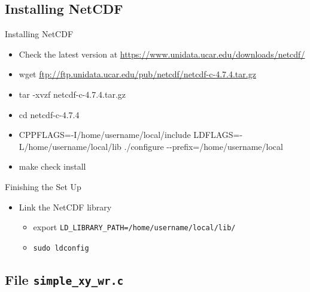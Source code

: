 \documentclass[compress,11pt,xcolor=svgnames,aspectratio=169]{beamer}
\begin{document}
\subsection{Installing NetCDF}

\begin{frame}[fragile]{Installing NetCDF}

\begin{itemize}
\setlength\itemsep{0.3cm}

  \item Check the latest version at \url{https://www.unidata.ucar.edu/downloads/netcdf/}
  \item {\footnotesize wget \url{ftp://ftp.unidata.ucar.edu/pub/netcdf/netcdf-c-4.7.4.tar.gz}}
  \item tar -xvzf netcdf-c-4.7.4.tar.gz
  \item cd netcdf-c-4.7.4
  \item CPPFLAGS=-I/home/username/local/include LDFLAGS=-L/home/username/local/lib ./configure {-}{-}prefix=/home/username/local
  \item make check install

\end{itemize}

\end{frame}

\begin{frame}[fragile]{Finishing the Set Up}

\begin{itemize}
\setlength\itemsep{0.8cm}
  \item Link the NetCDF library\\
  \begin{itemize}
  \setlength\itemsep{0.2cm}
    \item export \verb|LD_LIBRARY_PATH=/home/username/local/lib/|
    \item \verb|sudo ldconfig|
  \end{itemize}

\end{itemize}

\end{frame}

\subsection{File \texttt{simple\_xy\_wr.c}}


\acknowledgement
\end{document}
